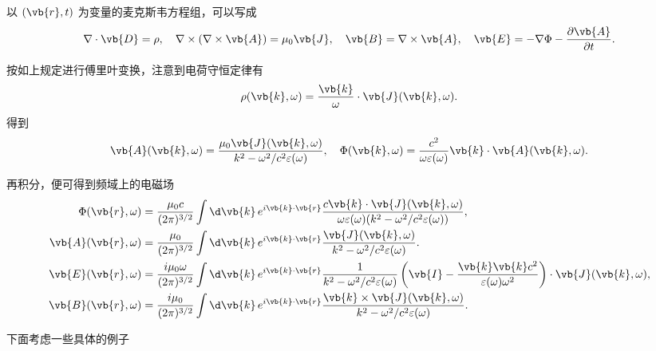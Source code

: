 以 \((\vb{r},t)\) 为变量的麦克斯韦方程组，可以写成
\begin{equation*}
	\nabla \cdot \vb{D} = \rho, \quad
	\nabla \times (\nabla \times \vb{A}) = \mu_{0} \vb{J}, \quad
	\vb{B} = \nabla \times \vb{A}, \quad
	\vb{E} = -\nabla \Phi - \frac{\partial \vb{A}}{\partial t}.
\end{equation*}

按如上规定进行傅里叶变换，注意到电荷守恒定律有
\begin{equation*}
	\rho(\vb{k},\omega) = \frac{\vb{k}}{\omega} \cdot \vb{J}(\vb{k},\omega).
\end{equation*}
得到
\begin{equation*}
	\vb{A}(\vb{k},\omega) = \frac{\mu_{0} \vb{J}(\vb{k},\omega)}{k^{2} - \omega^{2}/c^{2} \varepsilon(\omega)}, \quad
	\Phi(\vb{k},\omega) = \frac{c^{2}}{\omega \varepsilon(\omega)} \vb{k} \cdot \vb{A}(\vb{k},\omega).
\end{equation*}

再积分，便可得到频域上的电磁场
\begin{align*}
	\Phi(\vb{r},\omega) &= \frac{\mu_{0} c}{(2\pi)^{3/2}} \int \d \vb{k} \, e^{i\vb{k}\cdot\vb{r}} \frac{c \vb{k} \cdot \vb{J}(\vb{k},\omega)}{\omega \varepsilon(\omega) (k^{2} - \omega^{2}/c^{2} \varepsilon(\omega))}, \\
	\vb{A}(\vb{r},\omega) &= \frac{\mu_{0}}{(2\pi)^{3/2}} \int \d \vb{k} \, e^{i\vb{k}\cdot\vb{r}} \frac{\vb{J}(\vb{k},\omega)}{k^{2} - \omega^{2}/c^{2} \varepsilon(\omega)}.\\
	\vb{E}(\vb{r},\omega) &= \frac{i \mu_{0} \omega}{(2\pi)^{3/2}} \int \d \vb{k} \, e^{i\vb{k}\cdot\vb{r}} \frac{1}{k^{2} - \omega^{2}/c^{2} \varepsilon(\omega)}\left( \vb{I} - \frac{\vb{k} \vb{k} c^{2}}{\varepsilon(\omega) \omega^{2}} \right) \cdot \vb{J}(\vb{k},\omega), \\
	\vb{B}(\vb{r},\omega) &= \frac{i \mu_{0}}{(2\pi)^{3/2}} \int \d \vb{k} \, e^{i\vb{k}\cdot\vb{r}} \frac{\vb{k} \times \vb{J}(\vb{k},\omega)}{k^{2} - \omega^{2}/c^{2} \varepsilon(\omega)}.
\end{align*}

下面考虑一些具体的例子


